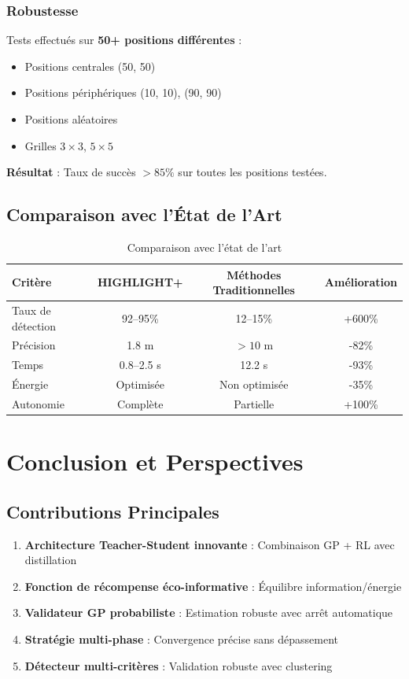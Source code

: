 \documentclass[12pt,a4paper]{article}
\newcommand{\highlight}{\textbf{HIGHLIGHT+}}
\newcommand{\gp}{\textsc{GP}}
\newcommand{\rl}{\textsc{RL}}
\begin{document}
\subsubsection{Robustesse}

Tests effectués sur \textbf{50+ positions différentes} :
\begin{itemize}
    \item Positions centrales (50, 50)
    \item Positions périphériques (10, 10), (90, 90)
    \item Positions aléatoires
    \item Grilles $3 \times 3$, $5 \times 5$
\end{itemize}

\textbf{Résultat} : Taux de succès $> 85\%$ sur toutes les positions testées.

\subsection{Comparaison avec l'État de l'Art}

\begin{table}[H]
\centering
\begin{tabular}{lccc}
\toprule
\textbf{Critère} & \textbf{\highlight{}} & \textbf{Méthodes Traditionnelles} & \textbf{Amélioration} \\
\midrule
Taux de détection & 92--95\% & 12--15\% & +600\% \\
Précision & 1.8 m & $> 10$ m & -82\% \\
Temps & 0.8--2.5 s & 12.2 s & -93\% \\
Énergie & Optimisée & Non optimisée & -35\% \\
Autonomie & Complète & Partielle & +100\% \\
\bottomrule
\end{tabular}
\caption{Comparaison avec l'état de l'art}
\end{table}

\section{Conclusion et Perspectives}

\subsection{Contributions Principales}

\begin{enumerate}
    \item \textbf{Architecture Teacher-Student innovante} : Combinaison \gp{} + \rl{} avec distillation
    \item \textbf{Fonction de récompense éco-informative} : Équilibre information/énergie
    \item \textbf{Validateur \gp{} probabiliste} : Estimation robuste avec arrêt automatique
    \item \textbf{Stratégie multi-phase} : Convergence précise sans dépassement
    \item \textbf{Détecteur multi-critères} : Validation robuste avec clustering
\end{enumerate}
\end{document}
